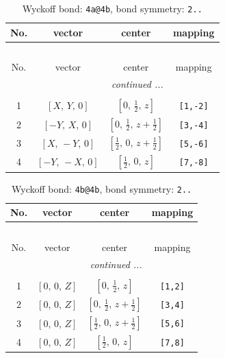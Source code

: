 \documentclass[fleqn,8pt]{jsarticle}
\begin{document}
\begin{longtable}{cccc}
\caption{Wyckoff bond: {\tt 4a@4b}, bond symmetry: {\tt 2..}}
 \\
 \hline \hline
No. & vector & center & mapping \\ \hline \endfirsthead

\multicolumn{3}{l}{\tablename\ \thetable{}} \\
 \hline \hline
No. & vector & center & mapping \\ \hline \endhead

 \hline \hline
\multicolumn{3}{r}{\footnotesize\it continued ...} \\ \endfoot

 \hline \hline
\multicolumn{3}{r}{} \\ \endlastfoot

1 & $\left[ X,\, Y,\, 0 \right]$ & $\left[ 0,\, \frac{1}{2},\, z \right]$ & {\tt [1,-2]} \\ \hline
2 & $\left[ - Y,\, X,\, 0 \right]$ & $\left[ 0,\, \frac{1}{2},\, z + \frac{1}{2} \right]$ & {\tt [3,-4]} \\ \hline
3 & $\left[ X,\, - Y,\, 0 \right]$ & $\left[ \frac{1}{2},\, 0,\, z + \frac{1}{2} \right]$ & {\tt [5,-6]} \\ \hline
4 & $\left[ - Y,\, - X,\, 0 \right]$ & $\left[ \frac{1}{2},\, 0,\, z \right]$ & {\tt [7,-8]} \\
\end{longtable}
\renewcommand{\arraystretch}{1.2}
\begin{longtable}{cccc}
\caption{Wyckoff bond: {\tt 4b@4b}, bond symmetry: {\tt 2..}}
 \\
 \hline \hline
No. & vector & center & mapping \\ \hline \endfirsthead

\multicolumn{3}{l}{\tablename\ \thetable{}} \\
 \hline \hline
No. & vector & center & mapping \\ \hline \endhead

 \hline \hline
\multicolumn{3}{r}{\footnotesize\it continued ...} \\ \endfoot

 \hline \hline
\multicolumn{3}{r}{} \\ \endlastfoot

1 & $\left[ 0,\, 0,\, Z \right]$ & $\left[ 0,\, \frac{1}{2},\, z \right]$ & {\tt [1,2]} \\ \hline
2 & $\left[ 0,\, 0,\, Z \right]$ & $\left[ 0,\, \frac{1}{2},\, z + \frac{1}{2} \right]$ & {\tt [3,4]} \\ \hline
3 & $\left[ 0,\, 0,\, Z \right]$ & $\left[ \frac{1}{2},\, 0,\, z + \frac{1}{2} \right]$ & {\tt [5,6]} \\ \hline
4 & $\left[ 0,\, 0,\, Z \right]$ & $\left[ \frac{1}{2},\, 0,\, z \right]$ & {\tt [7,8]} \\
\end{longtable}
\end{document}
